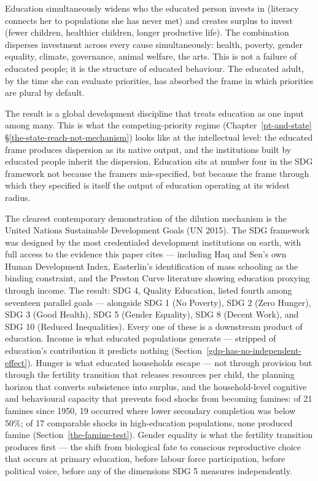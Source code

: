 \documentclass[12pt,letterpaper]{article}
\begin{document}
Education simultaneously widens who the educated person invests in
(literacy connects her to populations she has never met) and creates
surplus to invest (fewer children, healthier children, longer
productive life). The combination disperses investment across every
cause simultaneously: health, poverty, gender equality, climate,
governance, animal welfare, the arts. This is not a failure of
educated people; it is the structure of educated behaviour. The
educated adult, by the time she can evaluate priorities, has absorbed
the frame in which priorities are plural by default.

The result is a global development discipline that treats education
as one input among many. This is what the competing-priority regime
(Chapter~\ref{pt-and-state}\,\S\ref{the-state-reach-not-mechanism})
looks like at the intellectual level: the educated frame produces
dispersion as its native output, and the institutions built by
educated people inherit the dispersion. Education sits at number
four in the SDG framework not because the framers mis-specified, but
because the frame through which they specified is itself the output
of education operating at its widest radius.

The clearest contemporary demonstration of the dilution mechanism is
the United Nations Sustainable Development Goals (UN 2015). The SDG
framework was designed by the most credentialed development
institutions on earth, with full access to the evidence this paper
cites --- including Haq and Sen's own Human Development Index,
Easterlin's identification of mass schooling as the binding
constraint, and the Preston Curve literature showing education
proxying through income. The result: SDG 4, Quality Education, listed
fourth among seventeen parallel goals --- alongside SDG 1 (No
Poverty), SDG 2 (Zero Hunger), SDG 3 (Good Health), SDG 5 (Gender
Equality), SDG 8 (Decent Work), and SDG 10 (Reduced Inequalities).
Every one of these is a downstream product of education.
Income is what educated populations generate --- stripped of education's
contribution it predicts nothing
(Section~\ref{gdp-has-no-independent-effect}). Hunger is what educated
households escape --- not through provision but through the fertility
transition that releases resources per child, the planning horizon that
converts subsistence into surplus, and the household-level cognitive and
behavioural capacity that prevents food shocks from becoming famines:
of 21 famines since 1950, 19 occurred where lower secondary completion
was below 50\%; of 17 comparable shocks in high-education populations,
none produced famine (Section~\ref{the-famine-test}). Gender equality
is what the fertility transition produces first --- the shift from
biological fate to conscious reproductive choice that occurs at primary
education, before labour force participation, before political voice,
before any of the dimensions SDG 5 measures independently.
\end{document}
